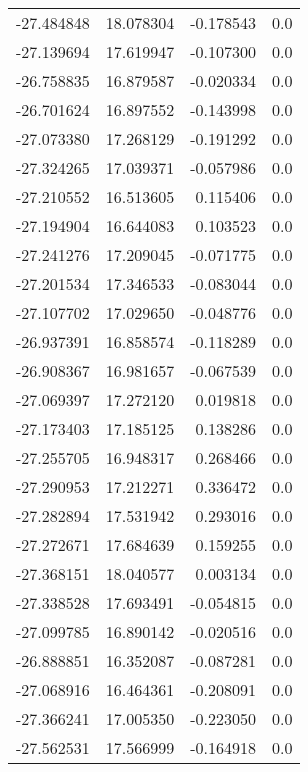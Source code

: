 \begin{tabular}{rrrr}
      -27.484848 &        18.078304 &   -0.178543 &   0.0 \\
      -27.139694 &        17.619947 &   -0.107300 &   0.0 \\
      -26.758835 &        16.879587 &   -0.020334 &   0.0 \\
      -26.701624 &        16.897552 &   -0.143998 &   0.0 \\
      -27.073380 &        17.268129 &   -0.191292 &   0.0 \\
      -27.324265 &        17.039371 &   -0.057986 &   0.0 \\
      -27.210552 &        16.513605 &    0.115406 &   0.0 \\
      -27.194904 &        16.644083 &    0.103523 &   0.0 \\
      -27.241276 &        17.209045 &   -0.071775 &   0.0 \\
      -27.201534 &        17.346533 &   -0.083044 &   0.0 \\
      -27.107702 &        17.029650 &   -0.048776 &   0.0 \\
      -26.937391 &        16.858574 &   -0.118289 &   0.0 \\
      -26.908367 &        16.981657 &   -0.067539 &   0.0 \\
      -27.069397 &        17.272120 &    0.019818 &   0.0 \\
      -27.173403 &        17.185125 &    0.138286 &   0.0 \\
      -27.255705 &        16.948317 &    0.268466 &   0.0 \\
      -27.290953 &        17.212271 &    0.336472 &   0.0 \\
      -27.282894 &        17.531942 &    0.293016 &   0.0 \\
      -27.272671 &        17.684639 &    0.159255 &   0.0 \\
      -27.368151 &        18.040577 &    0.003134 &   0.0 \\
      -27.338528 &        17.693491 &   -0.054815 &   0.0 \\
      -27.099785 &        16.890142 &   -0.020516 &   0.0 \\
      -26.888851 &        16.352087 &   -0.087281 &   0.0 \\
      -27.068916 &        16.464361 &   -0.208091 &   0.0 \\
      -27.366241 &        17.005350 &   -0.223050 &   0.0 \\
      -27.562531 &        17.566999 &   -0.164918 &   0.0 \\

\end{tabular}
